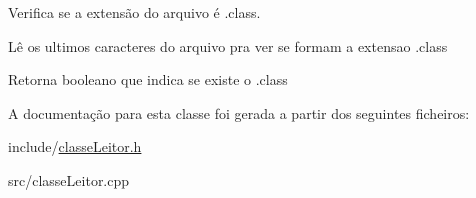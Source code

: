 Verifica se a extensão do arquivo é .class. 

Lê os ultimos caracteres do arquivo pra ver se formam a extensao .class \begin{DoxyReturn}{Retorna}
booleano que indica se existe o .class 
\end{DoxyReturn}


A documentação para esta classe foi gerada a partir dos seguintes ficheiros\+:\begin{DoxyCompactItemize}
\item 
include/\hyperlink{classeLeitor_8h}{classe\+Leitor.\+h}\item 
src/classe\+Leitor.\+cpp\end{DoxyCompactItemize}

